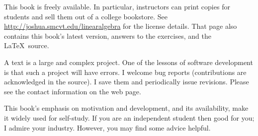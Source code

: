 {\medskip
{}
This book is freely available.
In particular, instructors can print copies for students 
and sell them out of a college bookstore.
See 
\url{http://joshua.smcvt.edu/linearalgebra}
for the license details.
That page also contains this book's latest version,
answers to the exercises, and the \LaTeX\ source.

A text is a large and complex project. 
One of the lessons of software
development is that such a project will have errors.
I welcome bug reports
(contributions are acknowledged in the source).
I save them and periodically issue revisions.
Please see the contact information on the web page.


\newcommand{\classday}[1]{\textsc{#1}}
\newcommand{\colwidth}{1.25in}

\medskip
{}
%
This book's emphasis on motivation and development,
and its availability, make it widely used for self-study.
If you are an independent student then good for you; I admire your industry.
However, you may find some advice helpful.

}
